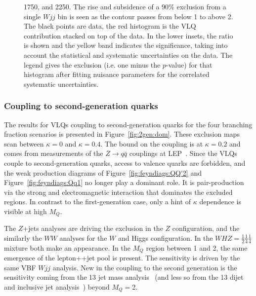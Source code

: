 \begin{figure}[th]
{      \protect{} \unit{1750}{\GeV}, and
      \protect{} \unit{2250}{\GeV}. The rise and
      subsidence of a 90\% \CLs exclusion from a single $Wjj$ bin is seen as the
      contour passes from below \unit{1}{\TeV} to above \unit{2}{\TeV}.
      The black points are data, the red histogram is the VLQ contribution stacked on top of the data.
      In the lower insets, the ratio is shown and the yellow band indicates the significance, taking into
      account the statistical and systematic uncertainties on the data. The legend gives the exclusion
      (i.e. one minus the $p$-value)  for that histogram after fitting nuisance parameters for the correlated
      systematic uncertainties.}
  \label{fig:gen1:wjjscan}
\end{figure}

\subsubsection{Coupling to second-generation quarks}
The results for VLQs coupling to second-generation quarks for the four branching fraction scenarios is presented in Figure~\ref{fig:2gen:dom}. These exclusion maps scan between $\kappa=0$ and $\kappa=0.4$. The bound on the coupling is at $\kappa=0.2$ and comes from measurements of the $Z \rightarrow q\bar{q}$ couplings at LEP~\cite{Buchkremer:2013bha,ALEPH:2005ab}. Since the VLQs couple to second-generation quarks, access to valence quarks are forbidden, and the weak production diagrams of Figure~\ref{fig:feyndiags:QQ'2} and Figure~\ref{fig:feyndiags:Qq1} no longer play a dominant role. It is pair-production via the strong and electromagnetic interaction that dominates the excluded regions. In contrast to the first-generation case, only a hint of $\kappa$ dependence is visible at high $M_Q$. 

The $Z$+jets analyses are driving the exclusion in the $Z$ configuration, and the similarly the \ATLAS $WW$ analyses for the $W$ and Higgs configuration. In the $WHZ=\frac{1}{2}\frac{1}{4}\frac{1}{4}$ mixture both make an appearance. In the $M_Q$ region between \unit{1}{\TeV} and \unit{2}{\TeV}, the same emergence of the lepton+\MET{}+jet pool is present. The sensitivity is driven by the same \ATLAS VBF $Wjj$ analysis. New in the coupling to the second generation is the sensitivity coming from the \unit{13}{\TeV} \CMS jet mass analysis~\cite{Sirunyan:2018xdh} (and less so from the \ATLAS \unit{13}{\TeV} dijet and inclusive jet analysis~\cite{Aaboud:2017wsi}) beyond $M_Q=$\unit{2}{\TeV}. 

